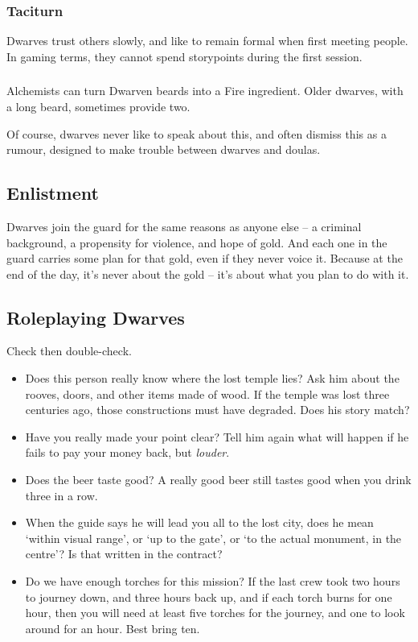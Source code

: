 \begin{multicols}{2}
\subsubsection{Taciturn}

Dwarves trust others slowly, and like to remain formal when first meeting people.
In gaming terms, they cannot spend \glspl{storypoint} during the first session.

\subsubsection{}

Alchemists can turn Dwarven beards into a Fire \gls{ingredient}.
Older dwarves, with a long beard, sometimes provide two.

Of course, dwarves never like to speak about this, and often dismiss this as a rumour, designed to make trouble between dwarves and \glspl{doula}.

\subsection{Enlistment}

Dwarves join the \gls{guard} for the same reasons as anyone else -- a criminal background, a propensity for violence, and hope of gold.
And each one in the \gls{guard} carries some plan for that gold, even if they never voice it.
Because at the end of the day, it's never about the gold -- it's about what you plan to do with it.

\subsection{Roleplaying Dwarves}

Check then double-check.

\begin{itemize}
  \item
  Does this person really know where the lost temple lies?
  Ask him about the rooves, doors, and other items made of wood.
  If the temple was lost three centuries ago, those constructions must have degraded.
  Does his story match?
  \item
  Have you really made your point clear?
  Tell him again what will happen if he fails to pay your money back, but \emph{louder}.
  \item
  Does the beer taste good?
  A really good beer still tastes good when you drink three in a row.
  \item
  When the guide says he will lead you all to the lost city, does he mean `within visual range', or `up to the gate', or `to the actual monument, in the centre'?
  Is that written in the contract?
  \item
  Do we have enough torches for this mission?
  If the last crew took two hours to journey down, and three hours back up, and if each torch burns for one hour, then you will need at least five torches for the journey, and one to look around for an hour.
  Best bring ten.


\end{itemize}
\end{multicols}
